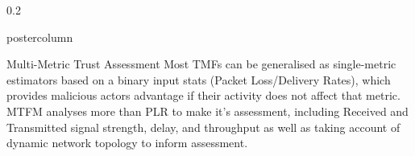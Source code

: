 \documentclass[final,hyperref={pdfpagelabels=false}]{beamer}
\def\colwidth{0.2\linewidth}
\begin{document}
\begin{frame}[fragile]
\begin{columns}[T]
\begin{column}{\colwidth}
\begin{beamercolorbox}[center,wd=\textwidth]{postercolumn}
\begin{minipage}[T]{.98\textwidth}
{						

						\begin{block}{Multi-Metric Trust Assessment}
              Most TMFs can be generalised as single-metric estimators based on a binary input stats (Packet Loss/Delivery Rates), which provides malicious actors advantage if their activity does not affect that metric. MTFM\cite{Guo11} analyses more than PLR to make it's assessment, including Received and Transmitted signal strength, delay, and throughput as well as taking account of dynamic network topology to inform assessment.


\end{block}}
\end{minipage}
\end{beamercolorbox}
\end{column}
\end{columns}
\end{frame}
\end{document}
